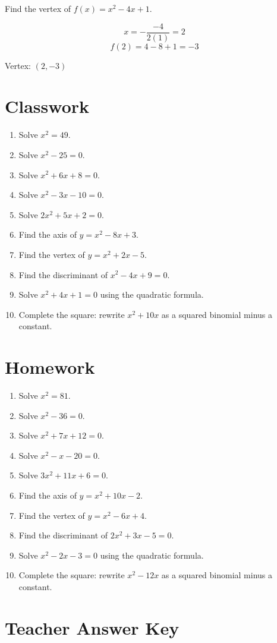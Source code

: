 \documentclass[11pt]{book}
\begin{document}
Find the vertex of \(f(x)=x^2-4x+1\).

\[x=-\frac{-4}{2(1)}=2\]
\[f(2)=4-8+1=-3\]

Vertex: \((2,-3)\)

\section{Classwork}

\begin{enumerate}
\item Solve \(x^2=49\).
\item Solve \(x^2-25=0\).
\item Solve \(x^2+6x+8=0\).
\item Solve \(x^2-3x-10=0\).
\item Solve \(2x^2+5x+2=0\).
\item Find the axis of \(y=x^2-8x+3\).
\item Find the vertex of \(y=x^2+2x-5\).
\item Find the discriminant of \(x^2-4x+9=0\).
\item Solve \(x^2+4x+1=0\) using the quadratic formula.
\item Complete the square: rewrite \(x^2+10x\) as a squared binomial minus a constant.
\end{enumerate}

\section{Homework}

\begin{enumerate}
\item Solve \(x^2=81\).
\item Solve \(x^2-36=0\).
\item Solve \(x^2+7x+12=0\).
\item Solve \(x^2-x-20=0\).
\item Solve \(3x^2+11x+6=0\).
\item Find the axis of \(y=x^2+10x-2\).
\item Find the vertex of \(y=x^2-6x+4\).
\item Find the discriminant of \(2x^2+3x-5=0\).
\item Solve \(x^2-2x-3=0\) using the quadratic formula.
\item Complete the square: rewrite \(x^2-12x\) as a squared binomial minus a constant.
\end{enumerate}

\section{Teacher Answer Key}
\end{document}
